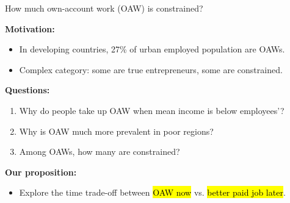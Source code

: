 \begin{frame}{How much own-account work (OAW) is constrained?}

\pause \textbf{Motivation:}

\begin{itemize}
  \item In developing countries, 27\% of urban employed population are OAWs.
  \item Complex category: some are true entrepreneurs, some are constrained.
\end{itemize} \pause

\textbf{Questions:}

\begin{enumerate}
  \item Why do people take up OAW when mean income is below employees'?
  \item Why is OAW much more prevalent in poor regions?
  \item Among OAWs, how many are constrained?
\end{enumerate} \pause

\textbf{Our proposition:} 
\begin{itemize}
  \item Explore the time trade-off between \hl{OAW now} vs. \hl{better paid job later}.
\end{itemize} \pause


\end{frame} %

